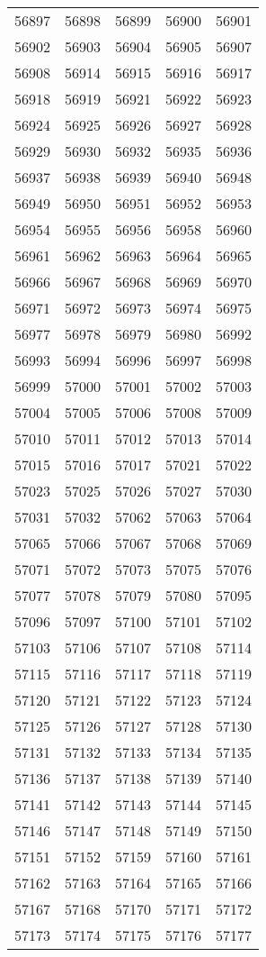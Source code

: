 \begin{longtable}{|c|c|c|c|c|}
56897&56898&56899&56900&56901\\ 
56902&56903&56904&56905&56907\\ 
56908&56914&56915&56916&56917\\ 
56918&56919&56921&56922&56923\\ 
56924&56925&56926&56927&56928\\ 
56929&56930&56932&56935&56936\\ 
56937&56938&56939&56940&56948\\ 
56949&56950&56951&56952&56953\\ 
56954&56955&56956&56958&56960\\ 
56961&56962&56963&56964&56965\\ 
56966&56967&56968&56969&56970\\ 
56971&56972&56973&56974&56975\\ 
56977&56978&56979&56980&56992\\ 
56993&56994&56996&56997&56998\\ 
56999&57000&57001&57002&57003\\ 
57004&57005&57006&57008&57009\\ 
57010&57011&57012&57013&57014\\ 
57015&57016&57017&57021&57022\\ 
57023&57025&57026&57027&57030\\ 
57031&57032&57062&57063&57064\\ 
57065&57066&57067&57068&57069\\ 
57071&57072&57073&57075&57076\\ 
57077&57078&57079&57080&57095\\ 
57096&57097&57100&57101&57102\\ 
57103&57106&57107&57108&57114\\ 
57115&57116&57117&57118&57119\\ 
57120&57121&57122&57123&57124\\ 
57125&57126&57127&57128&57130\\ 
57131&57132&57133&57134&57135\\ 
57136&57137&57138&57139&57140\\ 
57141&57142&57143&57144&57145\\ 
57146&57147&57148&57149&57150\\ 
57151&57152&57159&57160&57161\\ 
57162&57163&57164&57165&57166\\ 
57167&57168&57170&57171&57172\\ 
57173&57174&57175&57176&57177\\ 

\end{longtable}
